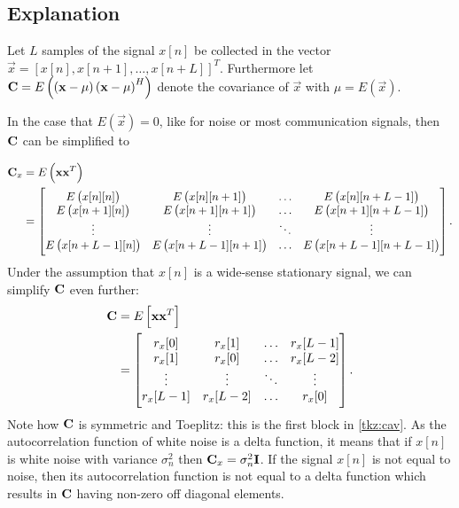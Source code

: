 \documentclass[a4paper, openany, oneside]{memoir}
\begin{document}
\subsection{Explanation}
Let $L$ samples of the signal $x[n]$ be collected in the vector $\vec{x} = \left[x[n], x[n+1], \ldots, x[n+L]\right]^T$. 
Furthermore let $\boldsymbol{\mathbf{C}} = E\left(\left(\boldsymbol{\mathbf{x}} - \mu \right)\left(\boldsymbol{\mathbf{x}} - \mu \right)^H\right)$ denote the covariance of $\vec{x}$ with $\mu = E(\vec{x})$.

In the case that $E\left(\vec{x}\right)=0$, like for noise or most communication signals, then $\boldsymbol{\mathbf{C}}$ can be simplified to

\begin{align*}
\boldsymbol{\mathbf{C}}_x &= E\left(\boldsymbol{\mathbf{x}}\boldsymbol{\mathbf{x}}^T\right) \\
&= \begin{bmatrix} 
E\left(x[n][n]\right) & E\left(x[n][n+1]\right) & \ldots & E\left(x[n][n+L-1]\right) \\
E\left(x[n+1][n]\right) & E\left(x[n+1][n+1]\right) & \ldots & E\left(x[n+1][n+L-1]\right) \\
\vdots & \vdots & \ddots & \vdots \\
E\left(x[n+L-1][n]\right) & E\left(x[n+L-1][n+1]\right) & \ldots & E\left(x[n+L-1][n+L-1]\right) \\
\end{bmatrix}.
\end{align*}
Under the assumption that $x[n]$ is a wide-sense stationary signal, we can simplify $\boldsymbol{\mathbf{C}}$ even further:
\begin{align*}
\boldsymbol{\mathbf{C}}&= E\left[\boldsymbol{\mathbf{x}}\boldsymbol{\mathbf{x}}^T\right] \\
&= \begin{bmatrix} 
r_x[0] & r_x[1] & \ldots & r_x[L-1] \\
r_x[1] & r_x[0] & \ldots & r_x[L-2] \\
\vdots & \vdots & \ddots & \vdots \\
r_x[L-1] & r_x[L-2] & \ldots & r_x[0] \\
\end{bmatrix}.
\end{align*}
Note how $\boldsymbol{\mathbf{C}}$ is symmetric and Toeplitz: this is the first block in \cref{tkz:cav}. As  the autocorrelation function of white noise is a delta function, it means that  if $x[n]$ is white noise with variance $\sigma_n^2$ then $\boldsymbol{\mathbf{C}}_x = \sigma_n^2\boldsymbol{\mathbf{I}}$.
If the signal $x[n]$ is not equal to noise, then its autocorrelation function is not equal to a delta function which results in $\boldsymbol{\mathbf{C}}$ having non-zero off diagonal elements.
\end{document}
